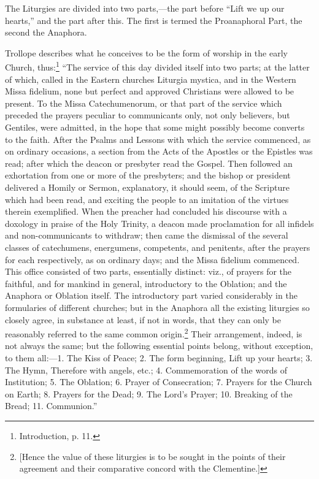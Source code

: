 The Liturgies are divided into two parts,—the part before “Lift we up our hearts,” and the part after this. The first is termed the Proanaphoral Part, the second the Anaphora.

Trollope describes what he conceives to be the form of worship in the early Church, thus:\footnote{\par  Introduction, p. 11.} “The service of this day divided itself into two parts; at the latter of which, called in the Eastern churches Liturgia mystica, and in the Western Missa fidelium, none but perfect and approved Christians were allowed to be present. To the Missa Catechumenorum, or that part of the service which preceded the prayers peculiar to communicants only, not only believers, but Gentiles, were admitted, in the hope that some might possibly become converts to the faith. After the Psalms and Lessons with which the service commenced, as on ordinary occasions, a section from the Acts of the Apostles or the Epistles was read; after which the deacon or presbyter read the Gospel. Then followed an exhortation from one or more of the presbyters; and the bishop or president delivered a Homily or Sermon, explanatory, it should seem, of the Scripture which had been read, and exciting the people to an imitation of the virtues therein exemplified. When the preacher had concluded his discourse with a doxology in praise of the Holy Trinity, a deacon made proclamation for all infidels and non-communicants to withdraw; then came the dismissal of the several classes of catechumens, energumens, competents, and penitents, after the prayers for each respectively, as on ordinary days; and the Missa fidelium commenced. This office consisted of two parts, essentially distinct: viz., of prayers for the faithful, and for mankind in general, introductory to the Oblation; and the Anaphora or Oblation itself. The introductory part varied considerably in the formularies of different churches; but in the Anaphora all the existing liturgies so closely agree, in substance at least, if not in words, that they can only be reasonably referred to the same common origin.\footnote{\par{}  [Hence the value of these liturgies is to be sought in the points of their agreement and their comparative concord with the Clementine.]} Their arrangement, indeed, is not always the same; but the following essential points belong, without exception, to them all:—1. The Kiss of Peace; 2. The form beginning, Lift up your hearts; 3. The Hymn, Therefore with angels, etc.; 4. Commemoration of the words of Institution; 5. The Oblation; 6. Prayer of Consecration; 7. Prayers for the Church on Earth; 8. Prayers for the Dead; 9. The Lord’s Prayer; 10. Breaking of the Bread; 11. Communion.”

